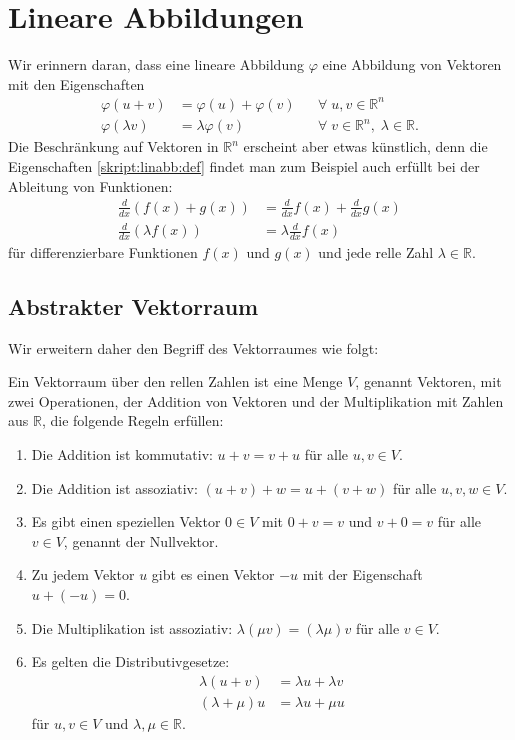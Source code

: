 %
%
%
\section{Lineare Abbildungen}
Wir erinnern daran, dass eine lineare Abbildung $\varphi$ eine
Abbildung von Vektoren mit den Eigenschaften
\begin{equation}
\begin{aligned}
\varphi(u+v)&=\varphi(u)+\varphi(v)   &&\forall\;u,v\in\mathbb R^n
\\
\varphi(\lambda v)&=\lambda\varphi(v) &&\forall\;v\in\mathbb R^n,\;\lambda\in\mathbb R.
\end{aligned}
\label{skript:linabb:def}
\end{equation}
Die Beschränkung auf Vektoren in $\mathbb R^n$ erscheint aber etwas
künstlich, denn die Eigenschaften
\eqref{skript:linabb:def}
findet man zum Beispiel auch erfüllt bei der Ableitung von Funktionen:
\begin{equation}
\begin{aligned}
\frac{d}{dx} ( f(x) + g(x)) &= \frac{d}{dx}f(x) + \frac{d}{dx}g(x)
\\
\frac{d}{dx}(\lambda f(x)) &= \lambda\frac{d}{dx}f(x)
\end{aligned}
\label{skript:linabb:abl}
\end{equation}
für differenzierbare Funktionen $f(x)$ und $g(x)$ und jede relle Zahl
$\lambda\in\mathbb R$.

%
%
\subsection{Abstrakter Vektorraum}
Wir erweitern daher den Begriff des Vektorraumes wie folgt:

\begin{definition}
Ein Vektorraum über den rellen Zahlen ist eine Menge $V$, genannt
Vektoren, mit zwei Operationen,
der Addition von Vektoren und der Multiplikation mit Zahlen aus $\mathbb R$,
die folgende Regeln erfüllen:
\begin{enumerate}
\item Die Addition ist kommutativ: $u+v=v+u$ für alle $u,v\in V$.
\item Die Addition ist assoziativ: $(u+v)+w=u+(v+w)$ für alle $u,v,w\in V$.
\item Es gibt einen speziellen Vektor $0\in V$ mit $0+v=v$ und $v+0=v$
für alle $v\in V$, genannt der Nullvektor.
\item Zu jedem Vektor $u$ gibt es einen Vektor $-u$ mit der Eigenschaft
$u+(-u)=0$.
\item Die Multiplikation ist assoziativ: $\lambda(\mu v) = (\lambda\mu)v$
für alle $v\in V$.
\item Es gelten die Distributivgesetze:
\begin{align*}
\lambda(u+v) &= \lambda u + \lambda v
\\
(\lambda + \mu)u&=\lambda u + \mu u
\end{align*}
für $u,v\in V$ und $\lambda,\mu\in\mathbb R$.
\end{enumerate}
\end{definition}

